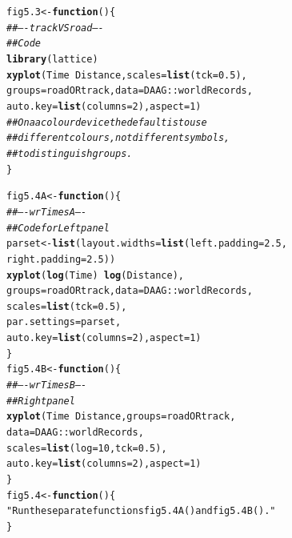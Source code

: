 \documentclass[12pt, a4paper,  BCOR=8.25mm, DIV=15]{scrartcl}\usepackage[]{graphicx}\usepackage[]{color}
\makeatletter
\newcommand{\hlnum}[1]{\textcolor[rgb]{0.686,0.059,0.569}{#1}}%
\newcommand{\hlstr}[1]{\textcolor[rgb]{0.192,0.494,0.8}{#1}}%
\newcommand{\hlcom}[1]{\textcolor[rgb]{0.678,0.584,0.686}{\textit{#1}}}%
\newcommand{\hlopt}[1]{\textcolor[rgb]{0,0,0}{#1}}%
\newcommand{\hlstd}[1]{\textcolor[rgb]{0.345,0.345,0.345}{#1}}%
\newcommand{\hlkwa}[1]{\textcolor[rgb]{0.161,0.373,0.58}{\textbf{#1}}}%
\newcommand{\hlkwb}[1]{\textcolor[rgb]{0.69,0.353,0.396}{#1}}%
\newcommand{\hlkwc}[1]{\textcolor[rgb]{0.333,0.667,0.333}{#1}}%
\newcommand{\hlkwd}[1]{\textcolor[rgb]{0.737,0.353,0.396}{\textbf{#1}}}%
\newenvironment{kframe}{%
 \def\at@end@of@kframe{}%
 \ifinner\ifhmode%
  \def\at@end@of@kframe{\end{minipage}}%
  \begin{minipage}{\columnwidth}%
 \fi\fi%
 \def\FrameCommand##1{\hskip\@totalleftmargin \hskip-\fboxsep
 \colorbox{shadecolor}{##1}\hskip-\fboxsep
     \hskip-\linewidth \hskip-\@totalleftmargin \hskip\columnwidth}%
 \MakeFramed {\advance\hsize-\width
   \@totalleftmargin\z@ \linewidth\hsize
   \@setminipage}}%
 {\par\unskip\endMakeFramed%
 \at@end@of@kframe}
\newenvironment{knitrout}{}{} %
\makeatother
\begin{document}
\begin{knitrout}
\color{fgcolor}\begin{kframe}
\begin{alltt}
\hlstd{fig5.3} \hlkwb{<-} \hlkwa{function}\hlstd{()\{}
\hlcom{## ---- trackVSroad ----}
\hlcom{## Code}
\hlkwd{library}\hlstd{(lattice)}
\hlkwd{xyplot}\hlstd{(Time} \hlopt{~} \hlstd{Distance,} \hlkwc{scales}\hlstd{=}\hlkwd{list}\hlstd{(}\hlkwc{tck}\hlstd{=}\hlnum{0.5}\hlstd{),}
       \hlkwc{groups}\hlstd{=roadORtrack,} \hlkwc{data}\hlstd{=DAAG}\hlopt{::}\hlstd{worldRecords,}
       \hlkwc{auto.key}\hlstd{=}\hlkwd{list}\hlstd{(}\hlkwc{columns}\hlstd{=}\hlnum{2}\hlstd{),} \hlkwc{aspect}\hlstd{=}\hlnum{1}\hlstd{)}
\hlcom{## On a a colour device the default is to use}
\hlcom{## different colours, not different symbols,}
\hlcom{## to distinguish groups.}
\hlstd{\}}
\end{alltt}
\end{kframe}
\end{knitrout}

\begin{knitrout}
\color{fgcolor}\begin{kframe}
\begin{alltt}
\hlstd{fig5.4A} \hlkwb{<-} \hlkwa{function}\hlstd{()\{}
\hlcom{## ---- wrTimesA ----}
\hlcom{## Code for Left panel}
\hlstd{parset} \hlkwb{<-} \hlkwd{list}\hlstd{(}\hlkwc{layout.widths}\hlstd{=}\hlkwd{list}\hlstd{(}\hlkwc{left.padding}\hlstd{=}\hlnum{2.5}\hlstd{,}
                                  \hlkwc{right.padding}\hlstd{=}\hlnum{2.5}\hlstd{))}
\hlkwd{xyplot}\hlstd{(}\hlkwd{log}\hlstd{(Time)} \hlopt{~} \hlkwd{log}\hlstd{(Distance),}
       \hlkwc{groups}\hlstd{=roadORtrack,} \hlkwc{data}\hlstd{=DAAG}\hlopt{::}\hlstd{worldRecords,}
       \hlkwc{scales}\hlstd{=}\hlkwd{list}\hlstd{(}\hlkwc{tck}\hlstd{=}\hlnum{0.5}\hlstd{),}
       \hlkwc{par.settings}\hlstd{=parset,}
       \hlkwc{auto.key}\hlstd{=}\hlkwd{list}\hlstd{(}\hlkwc{columns}\hlstd{=}\hlnum{2}\hlstd{),} \hlkwc{aspect}\hlstd{=}\hlnum{1}\hlstd{)}
\hlstd{\}}
\hlstd{fig5.4B} \hlkwb{<-} \hlkwa{function}\hlstd{()\{}
\hlcom{## ---- wrTimesB ----}
\hlcom{## Right panel}
\hlkwd{xyplot}\hlstd{(Time} \hlopt{~} \hlstd{Distance,} \hlkwc{groups}\hlstd{=roadORtrack,}
       \hlkwc{data}\hlstd{=DAAG}\hlopt{::}\hlstd{worldRecords,}
       \hlkwc{scales}\hlstd{=}\hlkwd{list}\hlstd{(}\hlkwc{log}\hlstd{=}\hlnum{10}\hlstd{,} \hlkwc{tck}\hlstd{=}\hlnum{0.5}\hlstd{),}
       \hlkwc{auto.key}\hlstd{=}\hlkwd{list}\hlstd{(}\hlkwc{columns}\hlstd{=}\hlnum{2}\hlstd{),} \hlkwc{aspect}\hlstd{=}\hlnum{1}\hlstd{)}
\hlstd{\}}
\hlstd{fig5.4} \hlkwb{<-} \hlkwa{function}\hlstd{()\{}
\hlstr{"Run the separate functions fig5.4A() and fig5.4B()."}
\hlstd{\}}
\end{alltt}
\end{kframe}
\end{knitrout}
\end{document}
